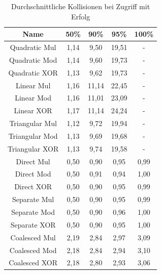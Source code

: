 \begin{table}[h!]
\begin{tabular}{c|cccc}
    Name & 50\% & 90\% & 95\% & 100\% \\
    \hline
    Quadratic Mul & 1,14 & 9,50 & 19,51 & - \\
    Quadratic Mod & 1,14 & 9,60 & 19,73 & - \\
    Quadratic XOR & 1,13 & 9,62 & 19,73 & - \\
    \hline
    Linear Mul & 1,16 & 11,14 & 22,45 & - \\
    Linear Mod & 1,16 & 11,01 & 23,09 & - \\
    Linear XOR & 1,17 & 11,14 & 24,24 & - \\
    \hline
    Triangular Mul & 1,12 & 9,72 & 19,94 & - \\
    Triangular Mod & 1,13 & 9,69 & 19,68 & - \\
    Triangular XOR & 1,13 & 9,74 & 19,58 & - \\
    \hline
    Direct Mul & 0,50 & 0,90 & 0,95 & 0,99 \\
    Direct Mod & 0,50 & 0,91 & 0,94 & 1,00 \\
    Direct XOR & 0,50 & 0,90 & 0,95 & 0,99 \\
    \hline
    Separate Mul & 0,50 & 0,90 & 0,95 & 0,99 \\
    Separate Mod & 0,50 & 0,90 & 0,96 & 1,00 \\
    Separate XOR & 0,50 & 0,90 & 0,95 & 1,00 \\
    \hline
    Coalesced Mul & 2,19 & 2,84 & 2,97 & 3,09 \\
    Coalesced Mod & 2,18 & 2,84 & 2,94 & 3,10 \\
    Coalesced XOR & 2,18 & 2,80 & 2,93 & 3,06 \\
\end{tabular}
\centering
\caption{Durchschnittliche Kollisionen bei Zugriff mit Erfolg}
\end{table}
